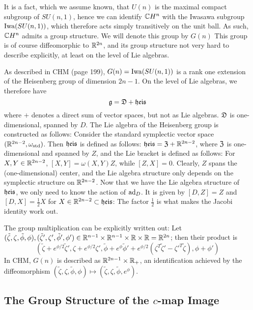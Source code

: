 It is a fact, which we assume known, that $U(n)$ is the maximal compact subgroup of $SU(n,1)$, hence we can identify $\mathbb{C} H^n$ with the Iwasawa subgroup $\operatorname{Iwa}(SU(n,1))$, which therefore acts simply transitively on the unit ball. As such, $\mathbb{C} H^n$ admits a group structure. We will denote this group by $G(n)$ This group is of course diffeomorphic to $\mathbb{R}^{2n}$, and its group structure not very hard to describe explicitly, at least on the level of Lie algebras.

As described in CHM (page 199), $G(n)=\operatorname{Iwa}(SU(n,1))$ is a rank one extension of the Heisenberg group of dimension $2n-1$. On the level of Lie algebras, we therefore have
\begin{equation*}
	\mathfrak{g}=\mathfrak{D}+\mathfrak{heis}
\end{equation*}
where $+$ denotes a direct sum of vector spaces, but not as Lie algebras. $\mathfrak{D}$ is one-dimensional, spanned by $D$. The Lie algebra of the Heisenberg group is constructed as follows: Consider the standard symplectic vector space $(\mathbb{R}^{2n-2},\omega_\text{std})$. Then $\mathfrak{heis}$ is defined as follows: $\mathfrak{heis}=\mathfrak{Z}+\mathbb{R}^{2n-2}$, where $\mathfrak{Z}$ is one-dimensional and spanned by $Z$, and the Lie bracket is defined as follows: For $X,Y\in \mathbb{R}^{2n-2}$, $[X,Y]=\omega(X,Y)Z$, while $[Z,X]=0$. Clearly, $Z$ spans the (one-dimensional) center, and the Lie algebra structure only depends on the symplectic structure on $\mathbb{R}^{2n-2}$. Now that we have the Lie algebra structure of $\mathfrak{heis}$, we only need to know the action of $\operatorname{ad}_D$. It is given by $[D,Z]=Z$ and $[D,X]=\frac{1}{2}X$ for $X\in \mathbb{R}^{2n-2}\subset \mathfrak{heis}$: The factor $\frac{1}{2}$ is what makes the Jacobi identity work out. 

The group multiplication can be explicitly written out: Let $(\tilde\zeta,\zeta,\tilde\phi,\phi),(\tilde\zeta',\zeta',\tilde\phi',\phi')\in \mathbb{R}^{n-1}\times \mathbb{R}^{n-1}\times\mathbb{R}\times \mathbb{R}=\mathbb{R}^{2n}$; then their product is
\begin{equation*}
	(\tilde\zeta+e^{\phi/2}\tilde\zeta',\zeta+e^{\phi/2}\zeta',\tilde\phi+e^{\phi}\tilde\phi'+e^{\phi/2}(\zeta^T\tilde\zeta'-\zeta'^T\tilde\zeta),\phi+\phi')
\end{equation*}
In CHM, $G(n)$ is described as $\mathbb{R}^{2n-1}\times \mathbb{R}_+$, an identification achieved by the diffeomorphism $(\tilde\zeta,\zeta,\tilde\phi,\phi)\mapsto (\tilde\zeta,\zeta,\tilde\phi,e^\phi)$.

\subsection{The Group Structure of the \texorpdfstring{$c$}{c}-map Image}

